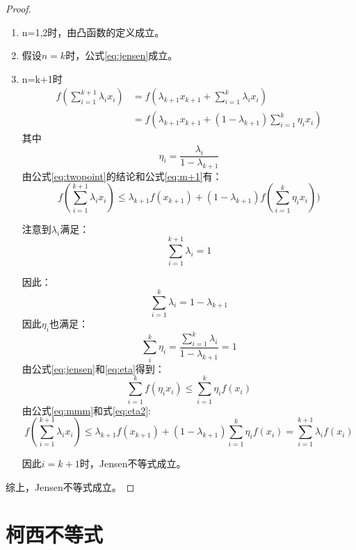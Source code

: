 \documentclass[a4paper]{article} %
\numberwithin{equation}{section} %
\begin{document}
\begin{proof}
\begin{enumerate}
\item n=1,2时，由凸函数的定义成立。
\item 假设$n=k$时，公式\eqref{eq:jensen}成立。
\item n=k+1时
\begin{align}
f(\sum_{i=1}^{k+1}\lambda_i x_i) 
&=f(\lambda_{k+1}x_{k+1}+\sum_{i=1}^k\lambda_i x_i) \\
&=f(\lambda_{k+1}x_{k+1}+(1-\lambda_{k+1})\sum_{i=1}^k\eta_i x_i) \label{eq:m+1}
\end{align}
其中
\begin{equation}
\eta_i=\frac{\lambda_i}{1-\lambda_{k+1}} 
\end{equation}
由公式\eqref{eq:twopoint}的结论和公式\eqref{eq:m+1}有：
\begin{equation}
f(\sum_{i=1}^{k+1}\lambda_i x_i)\le \lambda_{k+1}f(x_{k+1})+(1-\lambda_{k+1})f(\sum_{i=1}^k\eta_i x_i)) \label{eq:mmm}
\end{equation}

注意到$\lambda_i$满足：
\begin{equation}
\sum_{i=1}^{k+1}\lambda_i=1
\end{equation}

因此：
\begin{equation}
\sum_{i=1}^k\lambda_i=1-\lambda_{k+1}
\end{equation}
因此$\eta_i$也满足：
\begin{equation}
\sum_{i}^k\eta_i=\frac{\sum_{i=1}^k\lambda_i}{1-\lambda_{k+1}}=1 \label{eq:eta}
\end{equation}
由公式\eqref{eq:jensen}和\eqref{eq:eta}得到：
\begin{equation}
\sum_{i=1}^kf(\eta_ix_i) \le \sum_{i=1}^{k}\eta_if(x_i) \label{eq:eta2}
\end{equation}
由公式\eqref{eq:mmm}和式\eqref{eq:eta2}:
\begin{equation}
f(\sum_{i=1}^{k+1}\lambda_ix_i)\le \lambda_{k+1}f(x_{k+1})+(1-\lambda_{k+1})\sum_{i=1}^k\eta_if(x_i)=\sum_{i=1}^{k+1}\lambda_if(x_i)
\end{equation}

因此$i=k+1$时，Jensen不等式成立。
\end{enumerate}
综上，Jensen不等式成立。
\end{proof}

\section{柯西不等式}
\end{document}
